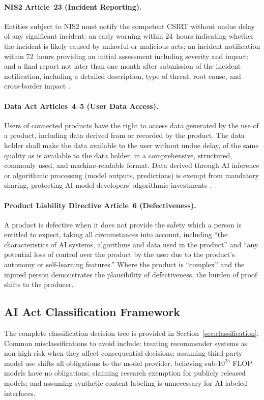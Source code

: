 \documentclass[11pt,a4paper]{article}
\begin{document}
\paragraph{NIS2 Article~23 (Incident Reporting).}
Entities subject to NIS2 must notify the competent CSIRT without undue delay of any significant incident: an early warning within 24~hours indicating whether the incident is likely caused by unlawful or malicious acts; an incident notification within 72~hours providing an initial assessment including severity and impact; and a final report not later than one month after submission of the incident notification, including a detailed description, type of threat, root cause, and cross-border impact \cite{nis2}.

\paragraph{Data Act Articles~4--5 (User Data Access).}
Users of connected products have the right to access data generated by the use of a product, including data derived from or recorded by the product. The data holder shall make the data available to the user without undue delay, of the same quality as is available to the data holder, in a comprehensive, structured, commonly used, and machine-readable format. Data derived through AI inference or algorithmic processing (model outputs, predictions) is exempt from mandatory sharing, protecting AI model developers' algorithmic investments \cite{dataact}.

\paragraph{Product Liability Directive Article~6 (Defectiveness).}
A product is defective when it does not provide the safety which a person is entitled to expect, taking all circumstances into account, including ``the characteristics of AI systems, algorithms and data used in the product'' and ``any potential loss of control over the product by the user due to the product's autonomy or self-learning features.'' Where the product is ``complex'' and the injured person demonstrates the plausibility of defectiveness, the burden of proof shifts to the producer.

\subsection{AI Act Classification Framework}

The complete classification decision tree is provided in Section~\ref{sec:classification}. Common misclassifications to avoid include: treating recommender systems as non-high-risk when they affect consequential decisions; assuming third-party model use shifts all obligations to the model provider; believing sub-$10^{25}$ FLOP models have no obligations; claiming research exemption for publicly released models; and assuming synthetic content labeling is unnecessary for AI-labeled interfaces.
\end{document}
